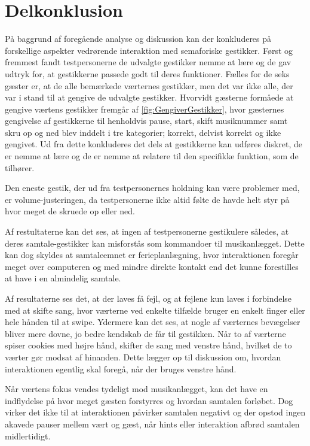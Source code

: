 \section{Delkonklusion}
\label{SocialAcceptDelkonklusion}
%
På baggrund af foregående analyse og diskussion kan der konkluderes på forskellige aspekter vedrørende interaktion med semaforiske gestikker. Først og fremmest fandt testpersonerne de udvalgte gestikker nemme at lære og de gav udtryk for, at gestikkerne passede godt til deres funktioner. Fælles for de seks gæster er, at de alle bemærkede værternes gestikker, men det var ikke alle, der var i stand til at gengive de udvalgte gestikker. Hvorvidt gæsterne formåede at gengive værtens gestikker fremgår af \autoref{fig:GengiverGestikker}, hvor gæsternes gengivelse af gestikkerne til henholdvis pause, start, skift musiknummer samt skru op og ned blev inddelt i tre kategorier; korrekt, delvist korrekt og ikke gengivet. Ud fra dette konkluderes det dels at gestikkerne kan udføres diskret, de er nemme at lære og de er nemme at relatere til den specifikke funktion, som de tilhører. 

Den eneste gestik, der ud fra testpersonernes holdning kan være problemer med, er volume-justeringen, da testpersonerne ikke altid følte de havde helt styr på hvor meget de skruede op eller ned. 

Af restultaterne kan det ses, at ingen af testpersonerne gestikulere således, at deres samtale-gestikker kan misforstås som kommandoer til musikanlægget. Dette kan dog skyldes at samtaleemnet er ferieplanlægning, hvor interaktionen foregår meget over computeren og med mindre direkte kontakt end det kunne forestilles at have i en almindelig samtale.

Af resultaterne ses det, at der laves få fejl, og at fejlene kun laves i forbindelse med at skifte sang, hvor værterne ved enkelte tilfælde bruger en enkelt finger eller hele hånden til at swipe. Ydermere kan det ses, at nogle af værternes bevægelser bliver mere dovne, jo bedre kendskab de får til gestikken. Når to af værterne spiser cookies med højre hånd, skifter de sang med venstre hånd, hvilket de to værter gør modsat af hinanden. Dette lægger op til diskussion om, hvordan interaktionen egentlig skal foregå, når der bruges venstre hånd.

Når værtens fokus vendes tydeligt mod musikanlægget, kan det have en indflydelse på hvor meget gæsten forstyrres og hvordan samtalen forløbet. Dog virker det ikke til at interaktionen påvirker samtalen negativt og der opstod ingen akavede pauser mellem vært og gæst, når hints eller interaktion afbrød samtalen midlertidigt. 

